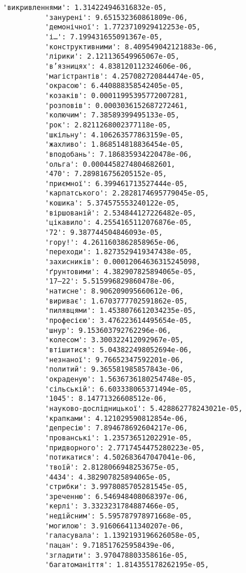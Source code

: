 \documentclass[11pt]{article}
\begin{document}
\begin{Verbatim}[commandchars=\\\{\}]
          'викривленнями': 1.314224946316832e-05,
          'занурені': 9.651532360861809e-06,
          'демонічної': 1.7723710929412253e-05,
          'і…': 7.199431655091367e-05,
          'конструктивними': 8.409549042121883e-06,
          'лірики': 2.121136549965067e-05,
          'в’язницях': 4.838120112324606e-06,
          'магістрантів': 4.257082720844474e-05,
          'окрасою': 6.440888358542405e-05,
          'козаків': 0.00011995395772007281,
          'розповів': 0.0003036152687272461,
          'колючим': 7.38589399495133e-05,
          'рок': 2.8211268002377118e-05,
          'шкільну': 4.106263577863159e-05,
          'жахливо': 1.868514818836454e-05,
          'вподобань': 7.186835934220478e-06,
          'ольга': 0.0004458274804682601,
          '470': 7.289816756205152e-05,
          'приємної': 6.399461713527444e-05,
          'карпатського': 2.2828174695779045e-05,
          'кошика': 5.374575553240122e-05,
          'віршованій': 2.534844127226482e-05,
          'цікавило': 4.2554165112076876e-05,
          '72': 9.387744504846093e-05,
          'гору!': 4.2611603862858965e-06,
          'переходи': 1.8273529419347438e-05,
          'захисників': 0.00012064636315245098,
          'ґрунтовими': 4.382907825894065e-05,
          '17–22': 5.515996829860478e-06,
          'натисне': 8.906209095660612e-06,
          'вириває': 1.6703777702591862e-05,
          'пилявцями': 1.4538076612034235e-05,
          'професією': 3.476223614495654e-05,
          'шнур': 9.153603792762296e-06,
          'колесом': 3.300322412092967e-05,
          'втішитися': 5.043822498052694e-06,
          'незнаної': 9.76652347592201e-06,
          'политий': 9.365581985857843e-06,
          'окраденую': 1.5636736180254748e-05,
          'сільській': 6.603338065371494e-05,
          '1045': 8.14771326608512e-06,
          'науково-дослідницької': 5.428862778243021e-05,
          'крапками': 4.121029590812854e-06,
          'депресію': 7.894678692604217e-06,
          'прованські': 1.23573651202291e-05,
          'придворного': 2.7717454475280223e-05,
          'потикатися': 4.502683647047041e-06,
          'твоїй': 2.8128066948253675e-05,
          '4434': 4.382907825894065e-05,
          'стрибки': 3.9978085705281545e-05,
          'зреченню': 6.546948408068397e-06,
          'керлі': 3.3323231784887466e-05,
          'недійсним': 5.595787978971668e-05,
          'могилою': 3.916066411340207e-06,
          'галасувала': 1.1392193196626058e-05,
          'пацан': 9.718517625958439e-06,
          'згладити': 3.970478803358616e-05,
          'багатоманіття': 1.814355178262195e-05,

\end{Verbatim}
\end{document}
